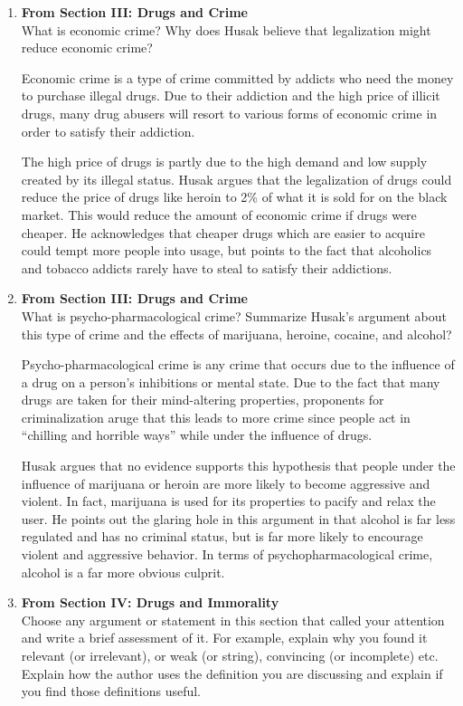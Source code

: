 \documentclass{article}
\begin{document}
\begin{enumerate}
  \item \textbf{From Section III: Drugs and Crime} \\
  What is economic crime? Why does Husak believe that legalization might reduce economic crime?
  \par Economic crime is a type of crime committed by addicts who need the money to purchase illegal drugs. Due to their addiction and the high price of illicit drugs, many drug abusers will resort to various forms of economic crime in order to satisfy their addiction.
  \par The high price of drugs is partly due to the high demand and low supply created by its illegal status. Husak argues that the legalization of drugs could reduce the price of drugs like heroin to 2\% of what it is sold for on the black market. This would reduce the amount of economic crime if drugs were cheaper. He acknowledges that cheaper drugs which are easier to acquire could tempt more people into usage, but points to the fact that alcoholics and tobacco addicts rarely have to steal to satisfy their addictions.
  \item \textbf{From Section III: Drugs and Crime} \\
  What is psycho-pharmacological crime? Summarize Husak's argument about this type of crime and the effects of marijuana, heroine, cocaine, and alcohol?
  \par Psycho-pharmacological crime is any crime that occurs due to the influence of a drug on a person’s inhibitions or mental state. Due to the fact that many drugs are taken for their mind-altering properties, proponents for criminalization aruge that this leads to more crime since people act in ``chilling and horrible ways'' while under the influence of drugs.
  \par Husak argues that no evidence supports this hypothesis that people under the influence of marijuana or heroin are more likely to become aggressive and violent. In fact, marijuana is used for its properties to pacify and relax the user. He points out the glaring hole in this argument in that alcohol is far less regulated and has no criminal status, but is far more likely to encourage violent and aggressive behavior. In terms of psychopharmacological crime, alcohol is a far more obvious culprit.
  \item \textbf{From Section IV: Drugs and Immorality} \\
  Choose any argument or statement in this section that called your attention and write a brief assessment of it. For example, explain why you found it relevant (or irrelevant), or weak (or string), convincing (or incomplete) etc. Explain how the author uses the definition you are discussing and explain if you find those definitions useful.

\end{enumerate}
\end{document}
